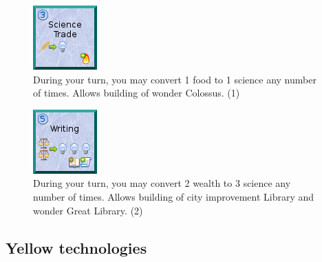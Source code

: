 \documentclass[11pt,a4paper,titlepage]{article}
\begin{document}
{{  \begin{figure}[!htb]
    \begin{minipage}[c]{0.1\textwidth}
      \includegraphics[scale=.7]{doe_tech_science_trade.png}
    \end{minipage}\hfill
    \begin{minipage}[c]{0.6\textwidth}
      \captionsetup{labelformat=empty, justification=justified, singlelinecheck=false}
      \caption{During your turn, you may convert 1 food to 1 science any number of times. Allows building of wonder Colossus. (1)}
    \end{minipage}\hfill
    \label{fig:tech_science_trade}
  \end{figure}

  \begin{figure}[!htb]
    \begin{minipage}[c]{0.1\textwidth}
      \includegraphics[scale=.7]{doe_tech_writing.png}
    \end{minipage}\hfill
    \begin{minipage}[c]{0.6\textwidth}
      \captionsetup{labelformat=empty, justification=justified, singlelinecheck=false}
      \caption{During your turn, you may convert 2 wealth to 3 science any number of times. Allows building of city improvement Library and wonder Great Library. (2)}
    \end{minipage}\hfill
    \label{fig:tech_writing}
  \end{figure}

  }\label{subsec:blue_technologies}
  \newpage
  \subsection{Yellow technologies}{

}}
\end{document}
